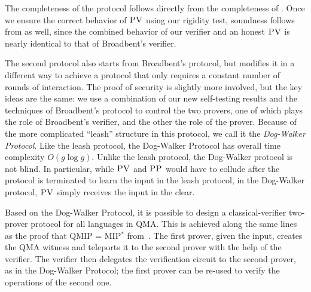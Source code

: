 The completeness of the protocol follows directly from the completeness of \cite{broadbent15howtoverify}. Once we ensure the correct behavior of $\textsc{PV}$ using our rigidity test, soundness follows from \cite{broadbent15howtoverify} as well, since the combined behavior of our verifier and an honest $\textsc{PV}$ is nearly identical to that of Broadbent's verifier. 

The second protocol also starts from Broadbent's protocol, but modifies it in a
different way to achieve a protocol that only requires a constant number of rounds of
interaction. The proof of security is slightly more involved, but the key ideas are the same: we use a combination of our new self-testing results and the techniques of Broadbent's protocol to control the two provers, one of which plays the role of Broadbent's verifier, and the other the role of the prover. Because of the more complicated ``leash'' structure in this protocol, we call it the \emph{Dog-Walker Protocol}. 
 Like the leash protocol, the Dog-Walker Protocol has overall time complexity $O(g\log g)$. Unlike the leash protocol, the Dog-Walker protocol is not blind. In particular, while $\textsc{PV}$ and $\textsc{PP}$ would have to collude after the protocol is terminated to learn the input in the leash protocol, in the Dog-Walker protocol, $\textsc{PV}$ simply receives the input in the clear.


Based on the Dog-Walker Protocol, it is possible to design a classical-verifier  two-prover protocol for all languages in QMA. This is achieved along the same lines as the proof that QMIP = MIP$^*$ from~\cite{reichardt2012classical}. The first prover, given the input, creates the QMA witness and teleports it to the second prover with the help of the verifier. The verifier then delegates the verification circuit to the second prover, as in the Dog-Walker Protocol; the first prover can be re-used to verify the operations of the second one.

